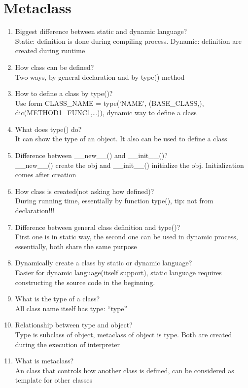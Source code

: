 \documentclass[10pt,a4paper,oneside]{article}
\begin{document}
\section{Metaclass}
\begin{enumerate}[1.]
\item Biggest difference between static and dynamic language?\\
Static: definition is done during compiling process. Dynamic: definition are created during runtime
\item How class can be defined?\\
Two ways, by general declaration and by type() method
\item How to define a class by type()?\\
Use form CLASS\_NAME = type(`NAME', (BASE\_CLASS,), dic(METHOD1=FUNC1,\dots)), dynamic way to define a class
\item What does type() do?\\
It can show the type of an object. It also can be used to define a class
\item Difference between \_\_new\_\_() and \_\_init\_\_()?\\
\_\_new\_\_() create the obj and \_\_init\_\_() initialize the obj. Initialization comes after creation
\item How class is created(not asking how defined)?\\
During running time, essentially by function type(), tip: not from declaration!!!
\item Difference between general class definition and type()?\\
First one is in static way, the second one can be used in dynamic process, essentially, both share the same purpose
\item Dynamically create a class by static or dynamic language?\\
Easier for dynamic language(itself support), static language requires constructing the source code in the beginning.
\item What is the type of a class?\\
All class name itself has type: ``type''
\item Relationship between type and object?\\
Type is subclass of object, metaclass of object is type. Both are created during the execution of interpreter
\item What is metaclass?\\
An class that controls how another class is defined, can be considered as template for other classes

\end{enumerate}
\end{document}
